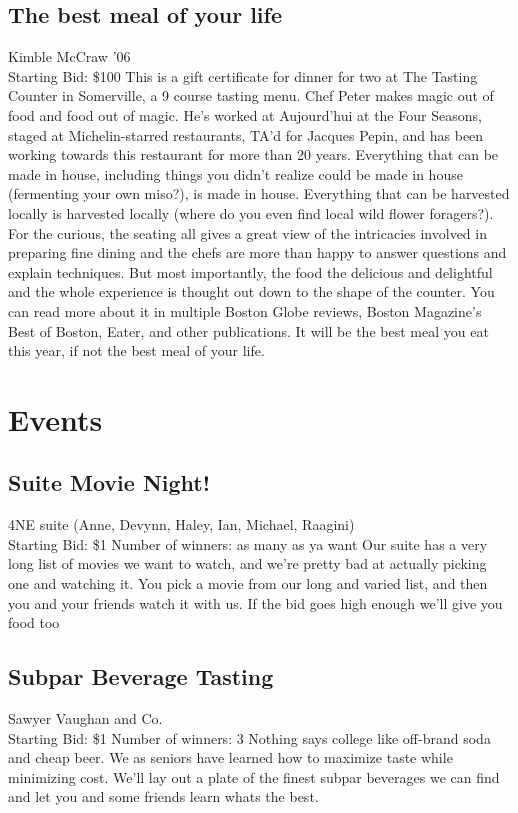 \documentclass[11pt]{article}
\begin{document}
\subsection{The best meal of your life}
Kimble McCraw '06
\\
Starting Bid: \$100
\newline
This is a gift certificate for dinner for two at The Tasting Counter in Somerville, a 9 course tasting menu. Chef Peter makes magic out of food and food out of magic. He's worked at Aujourd’hui at the Four Seasons, staged at Michelin-starred restaurants, TA'd for Jacques Pepin, and has been working towards this restaurant for more than 20 years. Everything that can be made in house, including things you didn't realize could be made in house (fermenting your own miso?), is made in house. Everything that can be harvested locally is harvested locally (where do you even find local wild flower foragers?). For the curious, the seating all gives a great view of the intricacies involved in preparing fine dining and the  chefs are more than happy to answer questions and explain techniques. But most importantly, the food the delicious and delightful and the whole experience is thought out down to the shape of the counter. You can read more about it in multiple Boston Globe reviews, Boston Magazine's Best of Boston, Eater, and other publications. It will be the best meal you eat this year, if not the best meal of your life.
\section{Events}
\subsection{Suite Movie Night!}
4NE suite (Anne, Devynn, Haley, Ian, Michael, Raagini)
\\
Starting Bid: \$1
\newline
Number of winners: as many as ya want
\newline
Our suite has a very long list of movies we want to watch, and we're pretty bad at actually picking one and watching it.  You pick a movie from our long and varied list, and then you and your friends watch it with us.  If the bid goes high enough we'll give you food too
\subsection{Subpar Beverage Tasting}
Sawyer Vaughan and Co.
\\
Starting Bid: \$1
\newline
Number of winners: 3
\newline
Nothing says college like off-brand soda and cheap beer. We as seniors have learned how to maximize taste while minimizing cost. We'll lay out a plate of the finest subpar beverages we can find and let you and some friends learn whats the best.
\end{document}
